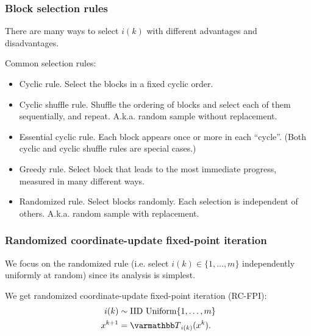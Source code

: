 \documentclass[10pt,mathserif]{beamer}
\begin{document}
\begin{frame}
\frametitle{Block selection rules}
There are many ways to select $i(k)$ with different advantages and disadvantages.

\vspace{0.2in}

Common selection rules:
\begin{itemize}
\item\pause
Cyclic rule. Select the blocks in a fixed cyclic order.
\item\pause
Cyclic shuffle rule. Shuffle the ordering of blocks and select each of them sequentially, and repeat. A.k.a. random sample without replacement.
\item\pause
Essential cyclic rule. Each block appears once or more in each ``cycle''. (Both cyclic and cyclic shuffle rules are special cases.)
\item\pause
Greedy rule. Select block that leads to the most immediate progress, measured in many different ways.

\item\pause
Randomized rule. Select blocks randomly. Each selection is independent of others. A.k.a. random sample with replacement.
\end{itemize}

\end{frame}

\begin{frame}
\frametitle{Randomized coordinate-update fixed-point iteration}

We focus on the randomized rule (i.e. select $i(k)\in\{1,\dots,m\}$ independently uniformly at random) since its analysis is simplest.

\vspace{0.2in}

We get randomized coordinate-update fixed-point iteration (RC-FPI):
\begin{align*}
i(k)&\sim \text{IID Uniform}\{1,\dots,m\}\\
x^{k+1}&= \opT_{i(k)}(x^k).
\end{align*}

\end{frame}
\end{document}
